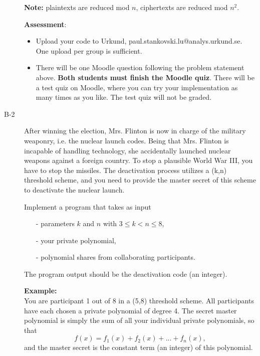\documentclass{article}
\begin{document}
\begin{description}
{    \textbf{Note:} plaintexts are reduced mod $n$, ciphertexts are reduced mod $n^2$.
    
    \textbf{Assessment}:
	\begin{itemize}
		\item Upload your code to Urkund, paul.stankovski.lu@analys.urkund.se.
        One upload per group is sufficient.
        
		\item There will be one Moodle question following the problem statement above. 
        \textbf{Both students must finish the Moodle quiz}.
        There will be a test quiz on Moodle, where you can try your implementation as many times as you like. 
        The test quiz will not be graded.
	\end{itemize}}

	\item[B-2]{After winning the election, Mrs. Flinton is now in charge of the military
    weaponry, i.e. the nuclear launch codes. Being that Mrs. Flinton is incapable of handling
    technology, she accidentally launched nuclear weapons against a foreign country.
    To stop a plausible World War III, you have to stop the missiles. The deactivation process
    utilizes a (k,n) threshold scheme, and you need to provide the master secret of this scheme
    to deactivate the nuclear launch.

    Implement a program that takes as input
	\begin{itemize}
		\item[-] parameters $k$ and $n$ with $3\leq k<n\leq 8$,
		\item[-] your private polynomial,
		\item[-] polynomial shares from collaborating participants.
	\end{itemize}
	The program output should be the deactivation code (an integer).
	
    \textbf{Example:}\\
    You are participant 1 out of 8 in a (5,8) threshold scheme.
    All participants have each chosen a private polynomial of degree 4.
    The secret master polynomial is simply the sum of all your individual private polynomials, so that
    \[f(x) = f_{1}(x) + f_{2}(x) + ... + f_{n}(x),\]
    and the master secret is the constant term (an integer) of this polynomial.

}
\end{description}
\end{document}
